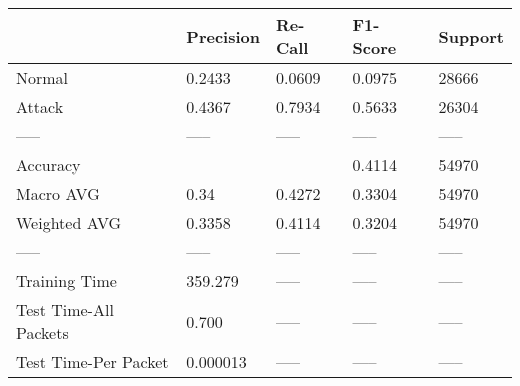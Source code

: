 \begin{tabular}{lllll}
\toprule
{} & Precision & Re-Call & F1-Score & Support \\
\midrule
Normal                &    0.2433 &  0.0609 &   0.0975 &   28666 \\
Attack                &    0.4367 &  0.7934 &   0.5633 &   26304 \\
-----                 &     ----- &   ----- &    ----- &   ----- \\
Accuracy              &           &         &   0.4114 &   54970 \\
Macro AVG             &      0.34 &  0.4272 &   0.3304 &   54970 \\
Weighted AVG          &    0.3358 &  0.4114 &   0.3204 &   54970 \\
-----                 &     ----- &   ----- &    ----- &   ----- \\
Training Time         &   359.279 &   ----- &    ----- &   ----- \\
Test Time-All Packets &     0.700 &   ----- &    ----- &   ----- \\
Test Time-Per Packet  &  0.000013 &   ----- &    ----- &   ----- \\
\bottomrule
\end{tabular}
